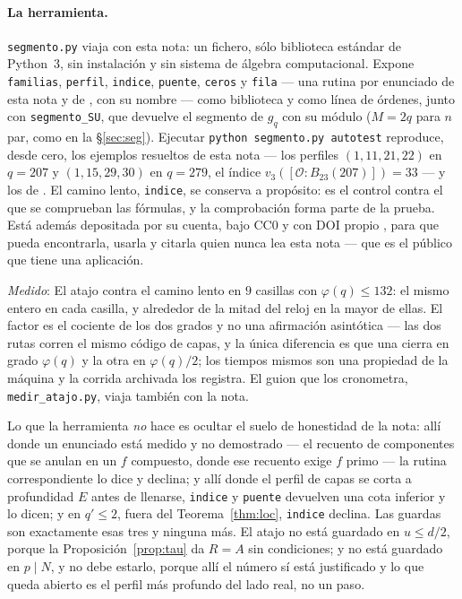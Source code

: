 \documentclass[11pt,a4paper]{article}
\theoremstyle{definition}
\newcommand{\cO}{\mathcal{O}}
\newcommand{\medido}[1]{\emph{Medido}: #1}
\begin{document}
\paragraph{La herramienta.} \texttt{segmento.py} viaja con esta nota: un fichero, s\'olo biblioteca
est\'andar de Python~3, sin instalaci\'on y sin sistema de \'algebra computacional. Expone
\texttt{familias}, \texttt{perfil}, \texttt{indice}, \texttt{puente}, \texttt{ceros} y
\texttt{fila} --- una rutina por enunciado de esta nota y de \cite{II}, con su nombre --- como
biblioteca y como l\'inea de \'ordenes, junto con \texttt{segmento\_SU}, que devuelve el segmento de
$g_q$ con su m\'odulo ($M=2q$ para $n$ par, como en la \S\ref{sec:seg}). Ejecutar \texttt{python segmento.py autotest} reproduce,
desde cero, los ejemplos resueltos de esta nota --- los perfiles $(1,11,21,22)$ en $q=207$ y
$(1,15,29,30)$ en $q=279$, el \'indice $v_3([\cO:B_{23}(207)])=33$ --- y los de \cite{II}. El camino lento, \texttt{indice}, se conserva a prop\'osito: es el control contra
el que se comprueban las f\'ormulas, y la comprobaci\'on forma parte de la prueba. Est\'a adem\'as
depositada por su cuenta, bajo CC0 y con DOI propio \cite{Tool}, para que pueda encontrarla, usarla
y citarla quien nunca lea esta nota --- que es el p\'ublico que tiene una aplicaci\'on.

\medido{El atajo contra el camino lento en $9$ casillas con $\varphi(q)\le132$: el mismo entero en
cada casilla, y alrededor de la mitad del reloj en la mayor de ellas. El factor es el cociente de
los dos grados y no una afirmaci\'on asint\'otica --- las dos rutas corren el mismo c\'odigo de
capas, y la \'unica diferencia es que una cierra en grado $\varphi(q)$ y la otra en $\varphi(q)/2$;
los tiempos mismos son una propiedad de la m\'aquina y la corrida archivada los registra. El guion
que los cronometra, \texttt{medir\_atajo.py}, viaja tambi\'en con la nota.}

\noindent Lo que la herramienta \emph{no} hace es ocultar el suelo de honestidad de la nota: all\'i
donde un enunciado est\'a medido y no demostrado --- el recuento de componentes que se anulan en
un $f$ compuesto, donde ese recuento exige $f$ primo --- la rutina correspondiente lo dice y
declina; y all\'i donde el perfil de capas se corta a profundidad $E$ antes de llenarse,
\texttt{indice} y \texttt{puente} devuelven una cota inferior y lo dicen; y en $q'\le2$, fuera del
Teorema~\ref{thm:loc}, \texttt{indice} declina. Las guardas son exactamente esas tres y ninguna
m\'as. El atajo no est\'a guardado en $u\le d/2$, porque la
Proposici\'on~\ref{prop:tau} da $R=A$ sin condiciones; y no est\'a guardado en $p\mid N$, y
no debe estarlo, porque all\'i el n\'umero s\'i est\'a justificado y lo que queda abierto es el
perfil m\'as profundo del lado real, no un paso.
\end{document}
